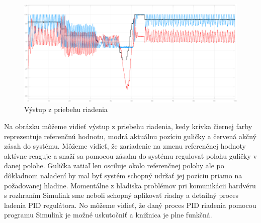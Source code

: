 \begin{figure}
	\centering
	\includegraphics[width=130mm]{obr/PIDgraf.eps}
	\caption{Výstup z priebehu riadenia }\label{OBRAZOK 3.2.2.2} 
\end{figure} 
Na obrázku  môžeme vidieť výstup z priebehu riadenia, kedy krivka čiernej farby reprezentuje referenčnú hodnotu, modrá aktuálnu pozíciu guličky a červená akčný zásah do systému. Môžeme vidieť, že zariadenie na zmenu referenčnej hodnoty aktívne reaguje a snaží sa pomocou zásahu do systému regulovať polohu guličky v danej polohe. Gulička zatiaľ len osciluje okolo referenčnej polohy ale  po dôkladnom naladení by mal byť systém schopný udržať jej pozíciu priamo na požadovanej hladine. Momentálne z hľadiska problémov pri komunikácii hardvéru s rozhraním Simulink sme neboli schopný aplikovať riadny a detailný proces ladenia PID regulátora. No môžeme vidieť, že daný proces PID riadenia pomocou programu Simulink je možné uskutočniť a knižnica je plne funkčná.



